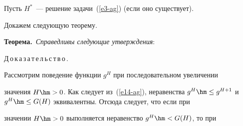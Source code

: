   \smallskip


  


  Пусть $H^*$~---  решение задачи~(\ref{e3-ag}) (если оно существует). 


Докажем следующую теорему.


  


  \smallskip


  


  \noindent


  \textbf{Теорема.}\ \textit{Справедливы следующие утверждения}: 




  


  \noindent


  Д\,о\,к\,а\,з\,а\,т\,е\,л\,ь\,с\,т\,в\,о\,.\ \ 


  Рассмотрим поведение функции $g^H$ при последовательном увеличении 


значения $H\hm>0$. Как следует из~(\ref{e14-ag}), неравенства $g^H\hm\leq 


g^{H+1}$ и~$g^H\hm\leq G(H)$ эквивалентны. Отсюда следует, что если при 


значении $H\hm>0$ выполняется неравенство $g^H\hm< G(H)$, то при 


